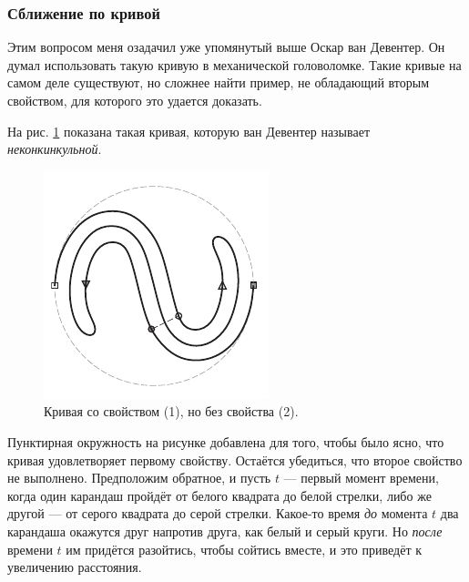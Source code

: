 
\subsubsection*{Сближение по кривой}

Этим вопросом меня озадачил уже упомянутый выше Оскар ван Девентер.
Он думал использовать такую кривую в механической головоломке.
Такие кривые на самом деле существуют, но сложнее найти пример, не обладающий вторым свойством, для которого это удается доказать.

На рис. \ref{pic:ss-curve} показана такая кривая, которую ван Девентер называет \emph{неконкинкульной}.

\begin{figure}[htb!]
\centering
\includegraphics[scale=1]{pics/ss-curve}
\caption{Кривая со свойством (1), но без свойства (2).}
\label{pic:ss-curve}
\end{figure}

Пунктирная окружность на рисунке добавлена для того, чтобы было ясно, что кривая удовлетворяет первому свойству.
Остаётся убедиться, что второе свойство не выполнено.
Предположим обратное, и пусть $t$ --- первый момент времени, когда один карандаш пройдёт от белого квадрата до белой стрелки,
либо же другой --- от серого квадрата до серой стрелки.
Какое-то время \emph{до} момента $t$ два карандаша окажутся друг напротив друга, как белый и серый круги.
Но \emph{после} времени $t$ им придётся разойтись, чтобы сойтись вместе, и это приведёт к увеличению расстояния.

